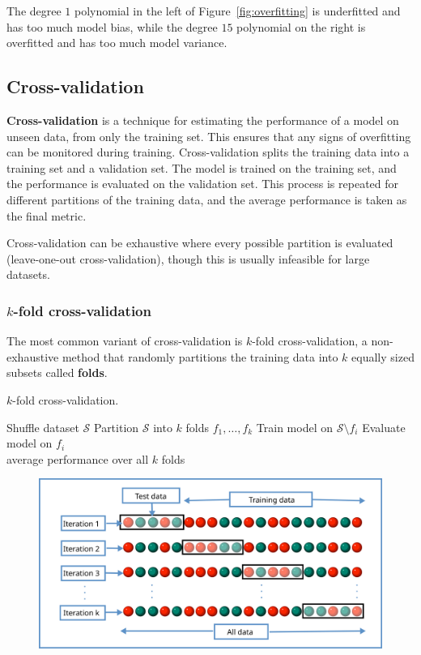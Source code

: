 \documentclass[12pt]{report}
\theoremstyle{definition}
\theoremstyle{remark}
\begin{document}
The degree $1$ polynomial in the left of Figure~\ref{fig:overfitting} is underfitted and has too much model bias, while the degree $15$ polynomial on the right is overfitted and has too much model variance.

\subsection{Cross-validation}
\textbf{Cross-validation} is a technique for estimating the performance of a model on unseen data, from only the training set. This ensures that any signs of overfitting can be monitored during training. Cross-validation splits the training data into a training set and a validation set. The model is trained on the training set, and the performance is evaluated on the validation set. This process is repeated for different partitions of the training data, and the average performance is taken as the final metric.

Cross-validation can be exhaustive where every possible partition is evaluated (leave-one-out cross-validation), though this is usually infeasible for large datasets.

\subsubsection{$k$-fold cross-validation}
The most common variant of cross-validation is $k$-fold cross-validation, a non-exhaustive method that randomly partitions the training data into $k$ equally sized subsets called \textbf{folds}.

\begin{algorithm}
    \caption{$k$-fold cross-validation.}\label{alg:k-fold}
    \begin{algorithmic}[1]
        \State Shuffle dataset $\mathcal{S}$
        \State Partition $\mathcal{S}$ into $k$ folds $f_1, \ldots, f_k$
            \State Train model on $\mathcal{S} \setminus f_i$
            \State Evaluate model on $f_i$
        \EndFor \\
        \Return average performance over all $k$ folds
    \end{algorithmic}
\end{algorithm}

\begin{figure}[h]
    \centering
    \includegraphics[width=\linewidth]{figs/kfold_cross_validation.png}
    \caption{\cite{commons_filek-fold_2024}}
    \label{fig:enter-label}
\end{figure}
\end{document}
